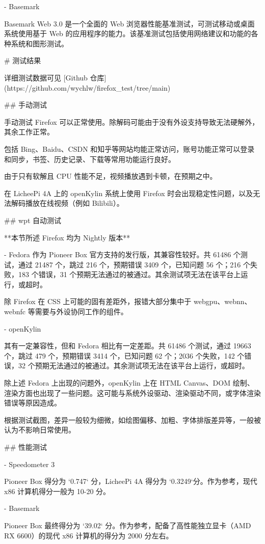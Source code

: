 \documentclass{article}
\begin{document}
\begin{markdown}
- Basemark

Basemark Web 3.0 是一个全面的 Web 浏览器性能基准测试，可测试移动或桌面系统使用基于 Web 的应用程序的能力。该基准测试包括使用网络建议和功能的各种系统和图形测试。

# 测试结果

详细测试数据可见 [Github 仓库](https://github.com/wychlw/firefox_test/tree/main)

## 手动测试

手动测试 Firefox 可以正常使用。除解码可能由于没有外设支持导致无法硬解外，其余工作正常。

包括 Bing、Baidu、CSDN 和知乎等网站均能正常访问，账号功能正常可以登录和同步，书签、历史记录、下载等常用功能运行良好。

由于只有软解且 CPU 性能不足，视频播放遇到卡顿，在预期之中。

在 LicheePi 4A 上的 openKylin 系统上使用 Firefox 时会出现稳定性问题，以及无法解码播放在线视频（例如 Bilibili）。

## wpt 自动测试

**本节所述 Firefox 均为 Nightly 版本**

- Fedora
作为 Pioneer Box 官方支持的发行版，其兼容性较好。共 61486 个测试，通过 21487 个，跳过 216 个，预期错误 3409 个，已知问题 56 个；216 个失败，183 个错误，31 个预期无法通过的被通过。其余测试项无法在该平台上运行，或超时。

除 Firefox 在 CSS 上可能的固有差距外，报错大部分集中于 webgpu、webnn、webnfc 等需要与外设协同工作的组件。

- openKylin

其有一定兼容性，但和 Fedora 相比有一定差距。共 61486 个测试，通过 19663 个，跳过 479 个，预期错误 3414 个，已知问题 62 个；2036 个失败，142 个错误，32 个预期无法通过的被通过。其余测试项无法在该平台上运行，或超时。

除上述 Fedora 上出现的问题外，openKylin 上在 HTML Canvas、DOM 绘制、渲染方面也出现了一些问题。这可能与系统外设驱动、渲染驱动不同，或字体渲染错误等原因造成。

根据测试截图，差异一般较为细微，如绘图偏移、加粗、字体排版差异等，一般被认为不影响日常使用。

## 性能测试

- Speedometer 3

Pioneer Box 得分为 `0.747` 分，LicheePi 4A 得分为 `0.3249`分。作为参考，现代 x86 计算机得分一般为 10-20 分。

- Basemark

Pioneer Box 最终得分为 `39.02` 分。作为参考，配备了高性能独立显卡（AMD RX 6600）的现代 x86 计算机的得分为 2000 分左右。


\end{markdown}
\end{document}
